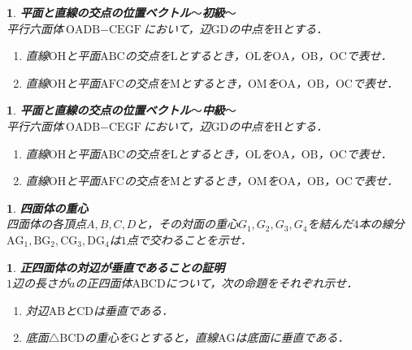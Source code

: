 \documentclass[10pt,
fleqn,
dvipdfmx,
uplatex
]{jsarticle}
\newtheorem{question}[Question]{}
\begin{document}
\begin{question}{\bf\boldmath 平面と直線の交点の位置ベクトル$〜$初級$〜$}\\
平行六面体$\text{OADB}-\text{CEGF}$において，辺$\text{GD}$の中点を$\text{H}$とする．
\begin{enumerate}
\item 直線$\text{OH}$と平面$\text{ABC}$の交点を$\text{L}$とするとき，$\text{OL}$を$\text{OA}$，$\text{OB}$，$\text{OC}$で表せ．
\item 直線$\text{OH}$と平面$\text{AFC}$の交点を$\text{M}$とするとき，$\text{OM}$を$\text{OA}$，$\text{OB}$，$\text{OC}$で表せ．
\end{enumerate}

\end{question}



\begin{question}{\bf\boldmath 平面と直線の交点の位置ベクトル$〜$中級$〜$}\\
平行六面体$\text{OADB}-\text{CEGF}$において，辺$\text{GD}$の中点を$\text{H}$とする．
\begin{enumerate}
\item 直線$\text{OH}$と平面$\text{ABC}$の交点を$\text{L}$とするとき，$\text{OL}$を$\text{OA}$，$\text{OB}$，$\text{OC}$で表せ．
\item 直線$\text{OH}$と平面$\text{AFC}$の交点を$\text{M}$とするとき，$\text{OM}$を$\text{OA}$，$\text{OB}$，$\text{OC}$で表せ．
\end{enumerate}

\end{question}



\begin{question}{\bf\boldmath 四面体の重心}\\
四面体の各頂点$A,B,C,D$と，その対面の重心$G_1,G_2,G_3,G_4$を結んだ$4$本の線分$\text{AG}_1,\text{BG}_2,\text{CG}_3,\text{DG}_4$は$1$点で交わることを示せ．
\end{question}



\begin{question}{\bf\boldmath 正四面体の対辺が垂直であることの証明}\\
$1$辺の長さが$a$の正四面体$\text{ABCD}$について，次の命題をそれぞれ示せ．
\begin{enumerate}
\item 対辺$\text{AB}$と$\text{CD}$は垂直である．
\item 底面$\triangle \text{BCD}$の重心を$\text{G}$とすると，直線$\text{AG}$は底面に垂直である．
\end{enumerate}

\end{question}
\end{document}
